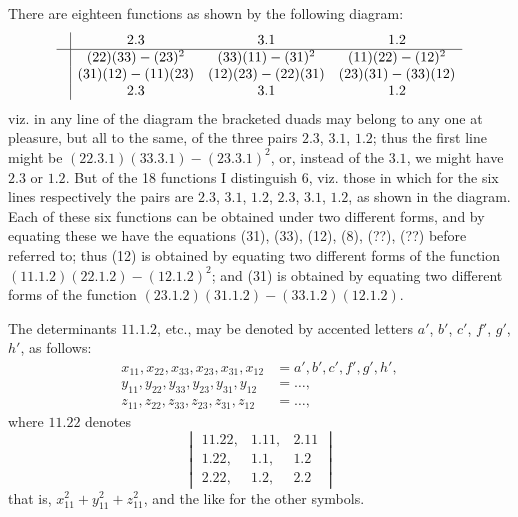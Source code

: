 \documentclass[11pt,a4paper]{book}
\begin{document}
There are eighteen functions as shown by the following diagram:
\[
\begin{array}{c|ccc}
& 2.3 & 3.1 & 1.2 \\ \hline
& (22)(33)-(23)^2 & (33)(11)-(31)^2 & (11)(22)-(12)^2 \\
& (31)(12)-(11)(23) & (12)(23)-(22)(31) & (23)(31)-(33)(12) \\
& 2.3 & 3.1 & 1.2
\end{array}
\]
viz. in any line of the diagram the bracketed duads may belong to any one at pleasure, but all to the same, of the three pairs $2.3$, $3.1$, $1.2$; thus the first line might be $(22.3.1)(33.3.1) - (23.3.1)^2$, or, instead of the $3.1$, we might have $2.3$ or $1.2$. But of the 18 functions I distinguish 6, viz. those in which for the six lines respectively the pairs are $2.3$, $3.1$, $1.2$, $2.3$, $3.1$, $1.2$, as shown in the diagram. Each of these six functions can be obtained under two different forms, and by equating these we have the equations (31), (33), (12), (8), (??), (??) before referred to; thus (12) is obtained by equating two different forms of the function $(11.1.2)(22.1.2) - (12.1.2)^2$; and (31) is obtained by equating two different forms of the function $(23.1.2)(31.1.2) - (33.1.2)(12.1.2)$.

The determinants $11.1.2$, etc., may be denoted by accented letters $a'$, $b'$, $c'$, $f'$, $g'$, $h'$, as follows:
\[
\begin{aligned}
x_{11}, x_{22}, x_{33}, x_{23}, x_{31}, x_{12} &= a', b', c', f', g', h', \\
y_{11}, y_{22}, y_{33}, y_{23}, y_{31}, y_{12} &= \ldots, \\
z_{11}, z_{22}, z_{33}, z_{23}, z_{31}, z_{12} &= \ldots,
\end{aligned}
\]
where $11.22$ denotes
\[
\begin{vmatrix}
11.22, & 1.11, & 2.11 \\
1.22, & 1.1, & 1.2 \\
2.22, & 1.2, & 2.2
\end{vmatrix}
\]
that is, $x_{11}^2 + y_{11}^2 + z_{11}^2$, and the like for the other symbols.
\end{document}
